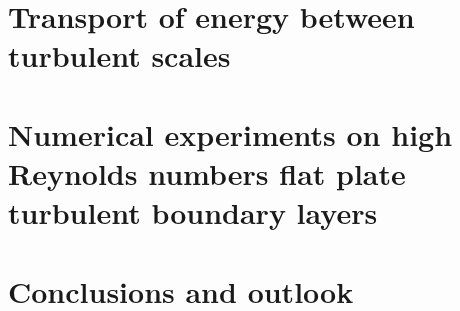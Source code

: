 \chapter{Transport of energy between turbulent scales}
%

%
\chapter{Numerical experiments on high Reynolds numbers flat plate turbulent boundary layers}
%

\chapter{Conclusions and outlook}
%







